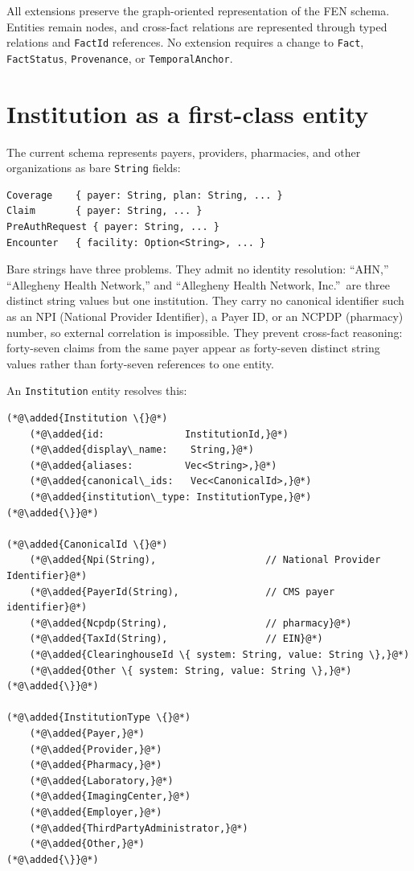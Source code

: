 \documentclass[11pt]{article}
\newcommand{\added}[1]{\textcolor{accentblue}{#1}}
\begin{document}
All extensions preserve the graph-oriented representation of the FEN
schema. Entities remain nodes, and cross-fact relations are represented
through typed relations and \texttt{FactId} references. No extension
requires a change to \texttt{Fact}, \texttt{FactStatus},
\texttt{Provenance}, or \texttt{TemporalAnchor}.

\section{Institution as a first-class entity}
\label{sec:institution}

The current schema represents payers, providers, pharmacies, and other
organizations as bare \texttt{String} fields:

\begin{lstlisting}
Coverage    { payer: String, plan: String, ... }
Claim       { payer: String, ... }
PreAuthRequest { payer: String, ... }
Encounter   { facility: Option<String>, ... }
\end{lstlisting}

Bare strings have three problems. They admit no identity resolution:
``AHN,'' ``Allegheny Health Network,'' and ``Allegheny Health Network,
Inc.''\ are three distinct string values but one institution. They
carry no canonical identifier such as an NPI (National Provider
Identifier), a Payer ID, or an NCPDP (pharmacy) number, so external
correlation is impossible. They prevent cross-fact reasoning: forty-seven
claims from the same payer appear as forty-seven distinct string values
rather than forty-seven references to one entity.

An \texttt{Institution} entity resolves this:

\begin{lstlisting}
(*@\added{Institution \{}@*)
    (*@\added{id:              InstitutionId,}@*)
    (*@\added{display\_name:    String,}@*)
    (*@\added{aliases:         Vec<String>,}@*)
    (*@\added{canonical\_ids:   Vec<CanonicalId>,}@*)
    (*@\added{institution\_type: InstitutionType,}@*)
(*@\added{\}}@*)

(*@\added{CanonicalId \{}@*)
    (*@\added{Npi(String),                   // National Provider Identifier}@*)
    (*@\added{PayerId(String),               // CMS payer identifier}@*)
    (*@\added{Ncpdp(String),                 // pharmacy}@*)
    (*@\added{TaxId(String),                 // EIN}@*)
    (*@\added{ClearinghouseId \{ system: String, value: String \},}@*)
    (*@\added{Other \{ system: String, value: String \},}@*)
(*@\added{\}}@*)

(*@\added{InstitutionType \{}@*)
    (*@\added{Payer,}@*)
    (*@\added{Provider,}@*)
    (*@\added{Pharmacy,}@*)
    (*@\added{Laboratory,}@*)
    (*@\added{ImagingCenter,}@*)
    (*@\added{Employer,}@*)
    (*@\added{ThirdPartyAdministrator,}@*)
    (*@\added{Other,}@*)
(*@\added{\}}@*)
\end{lstlisting}
\end{document}
